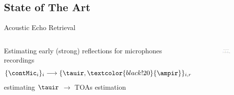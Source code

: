 \subsection*{State of The Art}

\begin{frame}[t]{Acoustic Echo Retrieval \hfill\faPalette}
    \begin{columns}[T,onlytextwidth]

            \vspace{.1em}
            Estimating early (strong) reflections for microphones recordings
            \begin{equation*}
                \{\contMic_i\}_i \longrightarrow \{ \tauir, \textcolor{black!20}{\ampir} \}_{i,r}
            \end{equation*}
            {\small estimating $\tauir$ $\to$ TOAs estimation}

            \begin{figure}
                \centering
                \includegraphics[width=\textwidth]{./figures/arrivals.png}
            \end{figure}

    \end{columns}


\end{frame}
